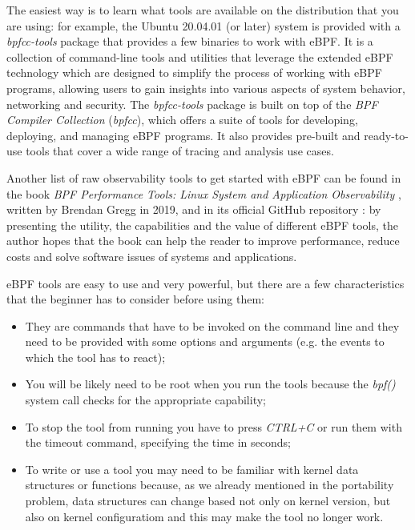 The easiest way is to learn what tools are available on the distribution that you are using: for example, the Ubuntu 20.04.01 (or later) system is provided with a \textit{bpfcc-tools} package that provides a few binaries to work with eBPF.
It is a collection of command-line tools and utilities that leverage the extended eBPF technology which are designed to simplify the process of working with eBPF programs, allowing users to gain insights into various aspects of system behavior, networking and security.
The \textit{bpfcc-tools} package is built on top of the \textit{BPF Compiler Collection} (\textit{bpfcc}), which offers a suite of tools for developing, deploying, and managing eBPF programs. 
It also provides pre-built and ready-to-use tools that cover a wide range of tracing and analysis use cases. 

Another list of raw observability tools to get started with eBPF can be found in the book \textit{BPF Performance Tools: Linux System and Application Observability} \cite{BPFToolsBookWebsite}, written by Brendan Gregg in 2019, and in its official GitHub repository \cite{BPFToolsBookGitHubRepo}: by presenting the utility, the capabilities and the value of different eBPF tools, the author hopes that the book can help the reader to improve performance, reduce costs and solve software issues of systems and applications.

eBPF tools are easy to use and very powerful, but there are a few characteristics that the beginner has to consider before using them:

\begin{itemize}
	\item They are commands that have to be invoked on the command line and they need 
		to be provided with some options and arguments (e.g. the events to which the tool has to react);
	\item You will be likely need to be root when you run the tools because the
		\textit{bpf()} system call checks for the appropriate capability;
	\item To stop the tool from running you have to press \textit{CTRL+C} or run them 
		with the timeout command, specifying the time in seconds;
	\item To write or use a tool you may need to be familiar with kernel data 
		structures or functions because, as we already mentioned in the portability problem, data structures can change based not only on kernel version, but also on kernel configuratiom and this may make the tool no longer work.
\end{itemize}

